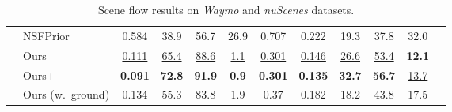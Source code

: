 \begin{table}[t]
{\begin{tabular}{clcccc|cccccc}
                                  & NSFPrior~\cite{li2021neural} &  0.584 & 38.9 & 56.7 & 26.9 & 0.707 & 0.222 & 19.3 & 37.8 & 32.0 \\
                                  \arrayrulecolor{lightgray}\cline{2-11}\arrayrulecolor{black}
                                  & Ours & \underline{0.111} & \underline{65.4} & \underline{88.6} & \underline{1.1} & \underline{0.301} & \underline{0.146} & \underline{26.6} & \underline{53.4} & \textbf{12.1} \\
                                  & Ours+ & \textbf{0.091} & \textbf{72.8} & \textbf{91.9} & \textbf{0.9} & \textbf{0.301} & \textbf{0.135} & \textbf{32.7} & \textbf{56.7} & \underline{13.7} \\
                                  & Ours (w.\ ground) & 0.134 & 55.3 & 83.8 & 1.9 & 0.37 & 0.182 & 18.2 & 43.8 & 17.5  \\   
    \bottomrule
    \end{tabular}
    }
	\caption{Scene flow results on \emph{Waymo} and \emph{nuScenes} datasets.}
	\label{tab:sf_main}
\end{table}
